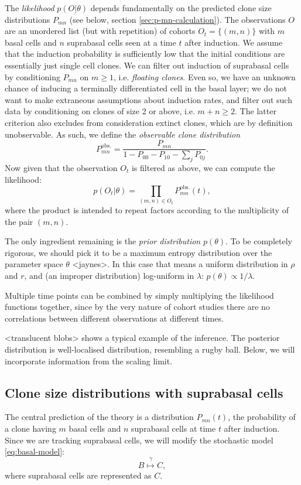 \documentclass[10pt,UKenglish]{article}
\begin{document}
The \emph{likelihood} $p(O|\theta)$ depends fundamentally on the predicted clone size distributions $P_{mn}$ (see below, section \ref{sec:p-mn-calculation}). The observations $O$ are an unordered list (but with repetition) of cohorts $O_t = \{(m,n)\}$ with $m$ basal cells and $n$ suprabasal cells seen at a time $t$ after induction. We assume that the induction probability is sufficiently low that the initial conditions are essentially just single cell clones. We can filter out induction of suprabasal cells by conditioning $P_{mn}$ on $m \ge 1$, i.e. \emph{floating clones}. Even so, we have an unknown chance of inducing a terminally differentiated cell in the basal layer; we do not want to make extraneous assumptions about induction rates, and filter out such data by conditioning on clones of size 2 or above, i.e. $m+n \ge 2$. The latter criterion also excludes from consideration extinct clones, which are by definition unobservable. As such, we define the \emph{observable clone distribution} $$P^\textrm{obs.}_{mn} = \frac{P_{mn}}{1 - P_{00} - P_{10} - \sum_j P_{0j}}.$$ Now given that the observation $O_t$ is filtered as above, we can compute the likelihood: $$p(O_t|\theta) = \prod_{(m,n) \in O_t} P^\textrm{obs.}_{mn}(t),$$ where the product is intended to repeat factors according to the multiplicity of the pair $(m,n)$.

The only ingredient remaining is the \emph{prior distribution} $p(\theta)$. To be completely rigorous, we should pick it to be a maximum entropy distribution over the parameter space $\theta$ <jaynes>. In this case that means a uniform distribution in $\rho$ and $r$, and (an improper distribution) log-uniform in $\lambda$: $p(\theta) \propto 1/\lambda$.

Multiple time points can be combined by simply multiplying the likelihood functions together, since by the very nature of cohort studies there are no correlations between different observations at different times.

<translucent blobs> shows a typical example of the inference. The posterior distribution is well-localised distribution, resembling a rugby ball. Below, we will incorporate information from the scaling limit.

\subsection{\label{sec:p-mn-calculation}Clone size distributions with suprabasal cells}

The central prediction of the theory is a distribution $P_{mn}(t)$, the probability of a clone having $m$ basal cells and $n$ suprabasal cells at time $t$ after induction. Since we are tracking suprabasal cells, we will modify the stochastic model \ref{eq:basal-model}:
\begin{equation*}
B \overset{\gamma}{\longmapsto} C,
\end{equation*}
where suprabasal cells are represented as $C$.
\end{document}
